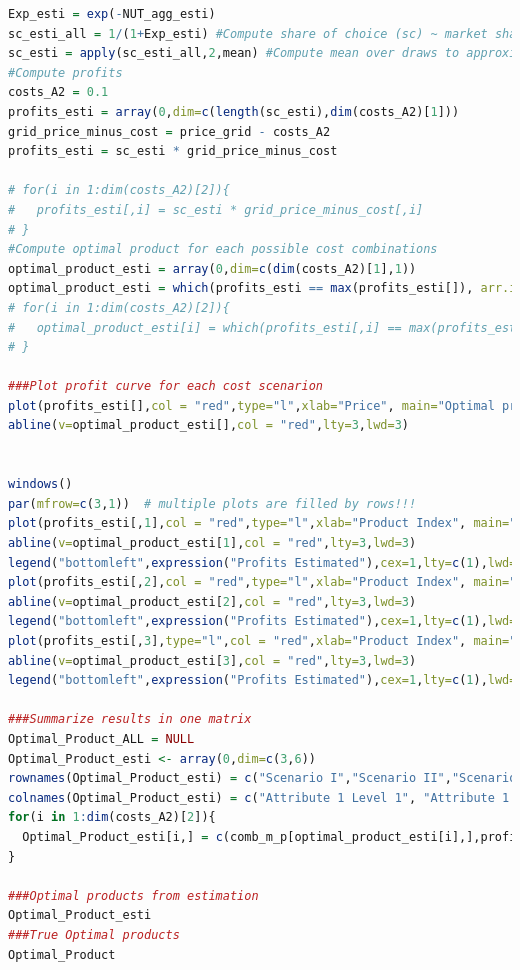 \documentclass[12pt,a4paper]{article}
\begin{document}
\begin{lstlisting}[language=R,caption={Estimation Code}, label=lst:estim]
Exp_esti = exp(-NUT_agg_esti) 
sc_esti_all = 1/(1+Exp_esti) #Compute share of choice (sc) ~ market share from monopolistic perspective
sc_esti = apply(sc_esti_all,2,mean) #Compute mean over draws to approximate the integral (expected value)
#Compute profits 
costs_A2 = 0.1
profits_esti = array(0,dim=c(length(sc_esti),dim(costs_A2)[1]))
grid_price_minus_cost = price_grid - costs_A2
profits_esti = sc_esti * grid_price_minus_cost

# for(i in 1:dim(costs_A2)[2]){
#   profits_esti[,i] = sc_esti * grid_price_minus_cost[,i]
# }
#Compute optimal product for each possible cost combinations
optimal_product_esti = array(0,dim=c(dim(costs_A2)[1],1))
optimal_product_esti = which(profits_esti == max(profits_esti[]), arr.ind = TRUE)
# for(i in 1:dim(costs_A2)[2]){
#   optimal_product_esti[i] = which(profits_esti[,i] == max(profits_esti[,i]), arr.ind = TRUE)
# }

###Plot profit curve for each cost scenarion
plot(profits_esti[],col = "red",type="l",xlab="Price", main="Optimal price of first brand in monopolistic market" ,ylab="Profits");grid()
abline(v=optimal_product_esti[],col = "red",lty=3,lwd=3)


windows()
par(mfrow=c(3,1))  # multiple plots are filled by rows!!!
plot(profits_esti[,1],col = "red",type="l",xlab="Product Index", main="Cost Scenario I" ,ylab="Profits");grid()
abline(v=optimal_product_esti[1],col = "red",lty=3,lwd=3)
legend("bottomleft",expression("Profits Estimated"),cex=1,lty=c(1),lwd=c(1),col=c("red"))
plot(profits_esti[,2],col = "red",type="l",xlab="Product Index", main="Cost Scenario II" ,ylab="Profits");grid()
abline(v=optimal_product_esti[2],col = "red",lty=3,lwd=3)
legend("bottomleft",expression("Profits Estimated"),cex=1,lty=c(1),lwd=c(1),col=c("red"))
plot(profits_esti[,3],type="l",col = "red",xlab="Product Index", main="Cost Scenario III" ,ylab="Profits");grid()
abline(v=optimal_product_esti[3],col = "red",lty=3,lwd=3)
legend("bottomleft",expression("Profits Estimated"),cex=1,lty=c(1),lwd=c(1),col=c("red"))

###Summarize results in one matrix
Optimal_Product_ALL = NULL
Optimal_Product_esti <- array(0,dim=c(3,6))
rownames(Optimal_Product_esti) = c("Scenario I","Scenario II","Scenario III")
colnames(Optimal_Product_esti) = c("Attribute 1 Level 1", "Attribute 1 Level 2", "Attribute 2 Level 1", "Attribute 2 Level 2", "Price", "Profits")
for(i in 1:dim(costs_A2)[2]){
  Optimal_Product_esti[i,] = c(comb_m_p[optimal_product_esti[i],],profits_esti[optimal_product_esti[i],i])
}

###Optimal products from estimation
Optimal_Product_esti
###True Optimal products
Optimal_Product

\end{lstlisting}
\end{document}
